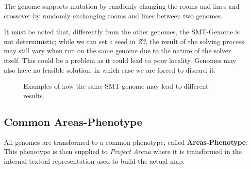 \documentclass{Configuration_Files/PoliMi3i_thesis}
\begin{document}
The genome supports mutation by randomly changing the rooms and lines and crossover by randomly exchanging rooms and lines between two genomes.

It must be noted that, differently from the other genomes, the SMT-Genome is not deterministic; while we can set a seed in \textit{Z3}, the result of the solving process may still vary when run on the same genome due to the nature of the solver itself. This could be a problem as it could lead to poor locality. Genomes may also have no feasible solution, in which case we are forced to discard it.

\begin{figure}
    \centering
    \caption[SMT-Genome determinism]{Examples of how the same SMT genome may lead to different results.}
\end{figure}


\subsection{Common Areas-Phenotype}
All genomes are transformed to a common phenotype, called \textbf{Areas-Phenotype}. This phenotype is then supplied to \textit{Project Arena} where it is transformed in the internal textual representation used to build the actual map.
\end{document}
